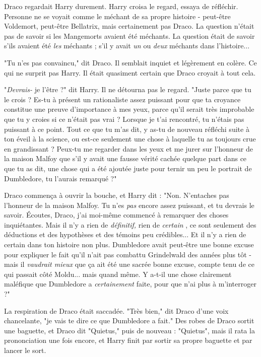 Draco regardait Harry durement. Harry croisa le regard, essaya de réfléchir. Personne ne se voyait comme le méchant de sa propre histoire - peut-être Voldemort, peut-être Bellatrix, mais certainement pas Draco. La question n'était pas de savoir si les Mangemorts avaient été méchants. La question était de savoir s'ils avaient été \emph{les}  méchants ; s'il y avait \emph{un}  ou \emph{deux}  méchants dans l'histoire...

"Tu n'es pas convaincu," dit Draco. Il semblait inquiet et légèrement en colère. Ce qui ne surprit pas Harry. Il était quasiment certain que Draco croyait à tout cela.

"\emph{Devrais-} je l'être ?" dit Harry. Il ne détourna pas le regard. "Juste parce que tu le crois ? Es-tu à présent un rationaliste assez puissant pour que ta croyance constitue une preuve d'importance à mes yeux, parce qu'il serait très improbable que tu y croies si ce n'était pas vrai ? Lorsque je t'ai rencontré, tu n'étais pas puissant à ce point. Tout ce que tu m'as dit, y as-tu de nouveau réfléchi suite à ton éveil à la science, ou est-ce seulement une chose à laquelle tu as toujours crue en grandissant ? Peux-tu me regarder dans les yeux et me jurer sur l'honneur de la maison Malfoy que s'il y avait une fausse vérité cachée quelque part dans ce que tu as dit, une chose qui a été ajoutée juste pour ternir un peu le portrait de Dumbledore, tu l'aurais remarqué ?"

Draco commença à ouvrir la bouche, et Harry dit : "Non. N'entaches pas l'honneur de la maison Malfoy. Tu n'es \emph{pas}  encore assez puissant, et tu devrais le savoir. Écoutes, Draco, j'ai moi-même commencé à remarquer des choses inquiétantes. Mais il n'y a rien de \emph{définitif,}  rien de \emph{certain} , ce sont seulement des déductions et des hypothèses et des témoins peu crédibles... Et il n'y a rien de certain dans ton histoire non plus. Dumbledore avait peut-être une bonne excuse pour expliquer le fait qu'il n'ait pas combattu Grindelwald des années plus tôt - mais il \emph{vaudrait mieux}  que ça ait été une sacrée bonne excuse, compte tenu de ce qui passait côté Moldu... mais quand même. Y a-t-il une chose clairement maléfique que Dumbledore a \emph{certainement}  faite, pour que n'ai plus à m'interroger ?"

La respiration de Draco était saccadée. "Très bien," dit Draco d'une voix chancelante, "je vais te dire ce que Dumbledore a fait." Des robes de Draco sortit une baguette, et Draco dit "Quietus," puis de nouveau : "Quietus", mais il rata la prononciation une fois encore, et Harry finit par sortir sa propre baguette et par lancer le sort.

